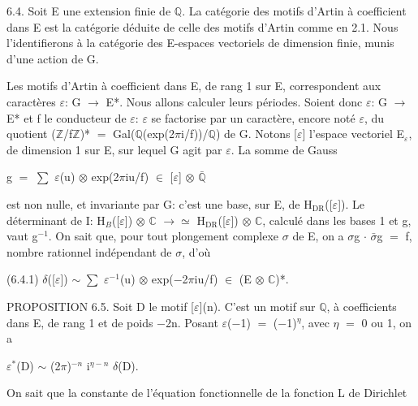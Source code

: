 \documentclass[10pt,twoside]{article}
\begin{document}
6.4. Soit E une extension finie de \ensuremath{ℚ}. La catégorie des motifs d’Artin à coefficient dans E est la catégorie déduite de celle des motifs d’Artin comme en 2.1. Nous l’identifierons à la catégorie des E-espaces vectoriels de dimension finie, munis d’une action de G.\par
Les motifs d’Artin à coefficient dans E, de rang 1 sur E, correspondent aux caractères \ensuremath{ε}: G \ensuremath{→} E*. Nous allons calculer leurs périodes. Soient donc \ensuremath{ε}: G \ensuremath{→} E* et f le conducteur de \ensuremath{ε}: \ensuremath{ε} se factorise par un caractère, encore noté \ensuremath{ε}, du quotient (\ensuremath{ℤ}/f\ensuremath{ℤ})* \ensuremath{=} Gal(\ensuremath{ℚ}(exp(2\ensuremath{π}i/f))/\ensuremath{ℚ}) de G. Notons [\ensuremath{ε}] l’espace vectoriel E\ensuremath{_{ε}}, de dimension 1 sur E, sur lequel G agit par \ensuremath{ε}. La somme de Gauss\par
g \ensuremath{=} \ensuremath{∑} \ensuremath{ε}(u) \ensuremath{⊗} exp(2\ensuremath{π}iu/f) \ensuremath{∈} [\ensuremath{ε}] \ensuremath{⊗} \ensuremath{\bar{ℚ}}\par
est non nulle, et invariante par G: c’est une base, sur E, de H\ensuremath{_{\mathrm{DR}}}([\ensuremath{ε}]). Le déterminant de I: H\ensuremath{_{B}}([\ensuremath{ε}]) \ensuremath{⊗} \ensuremath{ℂ} \ensuremath{→}\ensuremath{≃} H\ensuremath{_{\mathrm{DR}}}([\ensuremath{ε}]) \ensuremath{⊗} \ensuremath{ℂ}, calculé dans les bases 1 et g, vaut g\ensuremath{^{-1}}. On sait que, pour tout plongement complexe \ensuremath{σ} de E, on a \ensuremath{σ}g \ensuremath{·} \ensuremath{\bar{σ}}g \ensuremath{=} f, nombre rationnel indépendant de \ensuremath{σ}, d’où\par
(6.4.1)    \ensuremath{δ}([\ensuremath{ε}]) \ensuremath{∼} \ensuremath{∑} \ensuremath{ε}\ensuremath{^{-1}}(u) \ensuremath{⊗} exp(\ensuremath{−}2\ensuremath{π}iu/f) \ensuremath{∈} (E \ensuremath{⊗} \ensuremath{ℂ})*.\par
PROPOSITION 6.5. Soit D le motif [\ensuremath{ε}](n). C’est un motif sur \ensuremath{ℚ}, à coefficients dans E, de rang 1 et de poids \ensuremath{−}2n. Posant \ensuremath{ε}(\ensuremath{−}1) \ensuremath{=} (\ensuremath{−}1)\ensuremath{^{η}}, avec \ensuremath{η} \ensuremath{=} 0 ou 1, on a\par
\ensuremath{ε}\ensuremath{^{*}}(D) \ensuremath{∼} (2\ensuremath{π})\ensuremath{^{-n}} i\ensuremath{^{η−n}} \ensuremath{δ}(D).\par
On sait que la constante de l’équation fonctionnelle de la fonction L de Dirichlet\par
\end{document}
